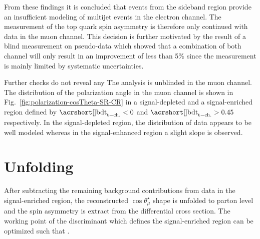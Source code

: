 
From these findings it is concluded that events from the sideband region provide an insufficient modeling of multijet events in the electron channel. The measurement of the top quark spin asymmetry is therefore only continued with data in the muon channel. This decision is further motivated by the result of a blind measurement on pseudo-data which showed that a combination of both channel will only result in an improvement of less than 5\% since the measurement is mainly limited by systematic uncertainties.

Further checks do not reveal any  The analysis is unblinded in the muon channel. The distribution of the polarization angle in the muon channel is shown in Fig.~\ref{fig:polarization-cosTheta-SR-CR} in a signal-depleted and a signal-enriched region defined by $\bdttch<0$ and $\bdttch>0.45$ respectively. In the signal-depleted region, the distribution of data appears to be well modeled whereas in the signal-enhanced region a slight slope is observed.



\section{Unfolding}
\label{sec:polarization-unfolding}

After subtracting the remaining background contributions from data in the signal-enriched region, the reconstructed $\cos\theta_{\mu}^\star$ shape is unfolded to parton level and the spin asymmetry is extract from the differential cross section. The working point of the \bdttch discriminant which defines the signal-enriched region can be optimized such that .


